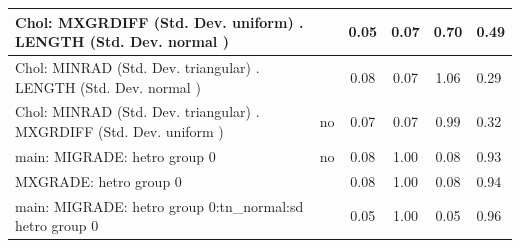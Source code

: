 \begin{table}
\begin{center}
\begin{tabular}{|l|l|c|c|c|l|}
			\hline
			 Chol: MXGRDIFF (Std. Dev. uniform) . LENGTH (Std. Dev.   normal ) &  & 0.05 & 0.07 & 0.70 & 0.49 \\
			\hline
			 Chol: MINRAD (Std. Dev. triangular) . LENGTH (Std. Dev.   normal ) &  & 0.08 & 0.07 & 1.06 & 0.29 \\
			\hline
			 Chol: MINRAD (Std. Dev. triangular) . MXGRDIFF (Std. Dev.   uniform ) & no & 0.07 & 0.07 & 0.99 & 0.32 \\
			\hline
			main: MIGRADE: hetro group 0 & no & 0.08 & 1.00 & 0.08 & 0.93 \\
			\hline
			MXGRADE: hetro group 0 &  & 0.08 & 1.00 & 0.08 & 0.94 \\
			\hline
			main: MIGRADE: hetro group 0:tn_normal:sd  hetro group 0 &  & 0.05 & 1.00 & 0.05 & 0.96 \\
			\hline
		\end{tabular}
	\end{center}
\end{table}